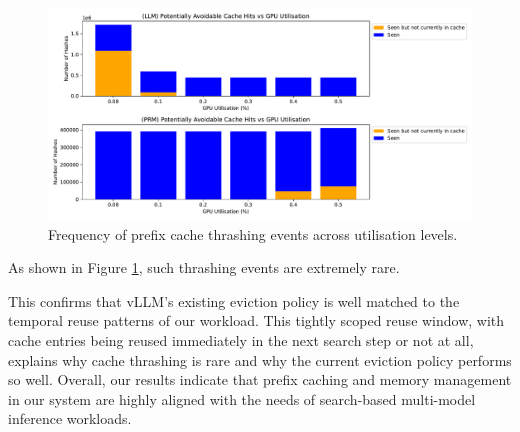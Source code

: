 \documentclass[11pt,twoside]{report}
\begin{document}
\begin{figure}[htbp]
\centering
\includegraphics[width=\textwidth]{figures/kv_thrashing_stats.pdf}
\caption{Frequency of prefix cache thrashing events across utilisation levels.}
\label{fig:cache_thrashing}
\end{figure}

As shown in Figure \ref{fig:cache_thrashing}, such thrashing events are extremely rare. 

This confirms that vLLM's existing eviction policy is well matched to the temporal reuse patterns of our workload.
This tightly scoped reuse window, with cache entries being reused immediately in the next search step or not at all, explains why cache thrashing is rare and why the current eviction policy performs so well. 
Overall, our results indicate that prefix caching and memory management in our system are highly aligned with the needs of search-based multi-model inference workloads.
\end{document}
